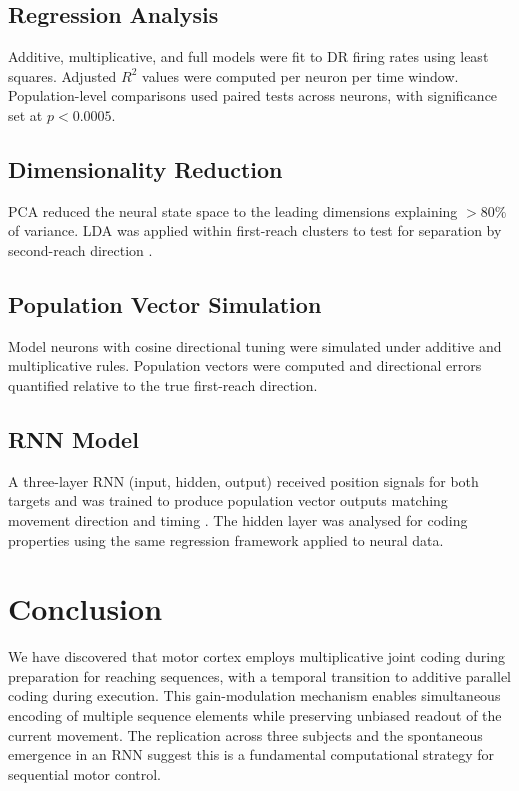 \documentclass[11pt]{article}
\begin{document}
\subsection{Regression Analysis}
Additive, multiplicative, and full models were fit to DR firing rates using least squares. Adjusted $R^2$ values were computed per neuron per time window. Population-level comparisons used paired tests across neurons, with significance set at $p < 0.0005$.

\subsection{Dimensionality Reduction}
PCA reduced the neural state space to the leading dimensions explaining $>80\%$ of variance. LDA was applied within first-reach clusters to test for separation by second-reach direction \citep{cunningham2014dimensionality}.

\subsection{Population Vector Simulation}
Model neurons with cosine directional tuning were simulated under additive and multiplicative rules. Population vectors were computed and directional errors quantified relative to the true first-reach direction.

\subsection{RNN Model}
A three-layer RNN (input, hidden, output) received position signals for both targets and was trained to produce population vector outputs matching movement direction and timing \citep{sussillo2015neural}. The hidden layer was analysed for coding properties using the same regression framework applied to neural data.

\section{Conclusion}

We have discovered that motor cortex employs multiplicative joint coding during preparation for reaching sequences, with a temporal transition to additive parallel coding during execution. This gain-modulation mechanism enables simultaneous encoding of multiple sequence elements while preserving unbiased readout of the current movement. The replication across three subjects and the spontaneous emergence in an RNN suggest this is a fundamental computational strategy for sequential motor control.



\end{document}
